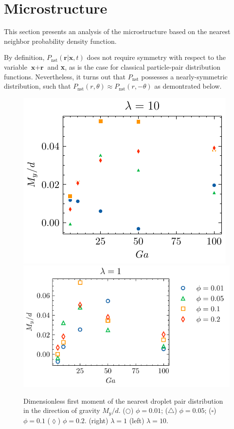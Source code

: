\section{Microstructure}
\label{sec:microstructure}

This section presents an analysis of the microstructure based on the nearest neighbor probability density function. 


By definition, $P_\text{nst}(\textbf{r}|\textbf{x},t)$ does not require symmetry with respect to the variable $\textbf{x}+\textbf{r}$ and \textbf{x}, as is the case for classical particle-pair distribution functions. 
Nevertheless, it turns out that $P_\text{nst}$ possesses a nearly-symmetric distribution, such that  $P_\text{nst}(r,\theta)\approx P_\text{nst}(r,- \theta)$ as demontrated below.
\begin{figure}[h!]
    \centering
    \includegraphics[height = 0.3\textwidth]{image/HOMOGENEOUS_NEW/PA/Ry_l_10.pdf}
    \includegraphics[height = 0.3\textwidth]{image/HOMOGENEOUS_NEW/PA/Ry_l_1.pdf}
    \caption{ Dimensionless first moment of the nearest droplet pair distribution in the direction of gravity $M_y/d$. 
    ($\pmb\bigcirc$) $\phi = 0.01$; ($\pmb\triangle$) $ \phi = 0.05$; ($\pmb\square$) $\phi = 0.1$ ($\pmb\lozenge$) $\phi = 0.2$.
    (right)  $\lambda  = 1$
    (left)  $\lambda  = 10$.
    }
    \label{fig:ap:RY}
\end{figure}
